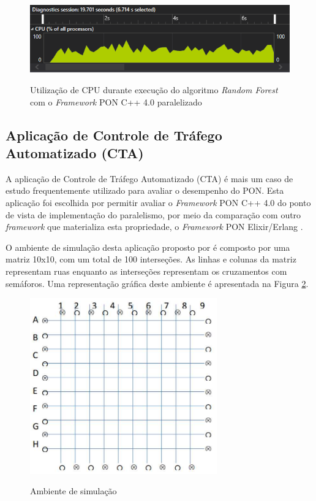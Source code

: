 \begin{figure}[!htb]
\centering
\caption{Utilização de CPU durante execução do algoritmo \textit{Random Forest}
com o \textit{Framework} PON C++ 4.0 paralelizado}
\includegraphics[width=\textwidth]{../figures/cpu_rf_par.png}
\smallskip
{}
\label{fig:rf_cpu_par}
\end{figure}


\subsection{Aplicação de Controle de Tráfego Automatizado (CTA)}\label{sec:semaforo}

A aplicação de Controle de Tráfego Automatizado (CTA) é mais um caso de estudo frequentemente
utilizado para avaliar o desempenho do PON. Esta aplicação foi escolhida por
permitir avaliar o \textit{Framework} PON C++ 4.0  do ponto de vista de
implementação do paralelismo, por meio da comparação com outro
\textit{framework} que materializa esta propriedade, o \textit{Framework} PON
Elixir/Erlang \cite{msc_negrini_2019}.

O ambiente de simulação desta aplicação proposto por  é
composto por uma matriz 10x10, com um total de 100 interseções. As linhas e
colunas da matriz representam ruas enquanto as interseções representam os
cruzamentos com semáforos. Uma representação gráfica deste ambiente é
apresentada na Figura \ref{fig:cta_renaux}.

\begin{figure}[!htb]
\centering
\caption{Ambiente de simulação}
\includegraphics[width=0.72\textwidth]{../figures/semaforos_renaux.png}
\smallskip
{}
\label{fig:cta_renaux}
\end{figure}

